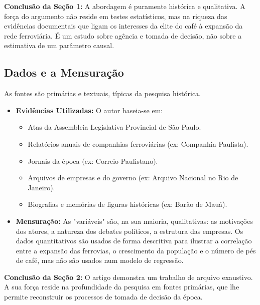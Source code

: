 \documentclass[12pt, a4paper]{article}
\begin{document}
\noindent\textbf{Conclusão da Seção 1:} A abordagem é puramente histórica e qualitativa. A força do argumento não reside em testes estatísticos, mas na riqueza das evidências documentais que ligam os interesses da elite do café à expansão da rede ferroviária. É um estudo sobre agência e tomada de decisão, não sobre a estimativa de um parâmetro causal.

\subsection{Dados e a Mensuração}
As fontes são primárias e textuais, típicas da pesquisa histórica.
\begin{itemize}
    \item \textbf{Evidências Utilizadas:} O autor baseia-se em:
        \begin{itemize}
            \item Atas da Assembleia Legislativa Provincial de São Paulo.
            \item Relatórios anuais de companhias ferroviárias (ex: Companhia Paulista).
            \item Jornais da época (ex: Correio Paulistano).
            \item Arquivos de empresas e do governo (ex: Arquivo Nacional no Rio de Janeiro).
            \item Biografias e memórias de figuras históricas (ex: Barão de Mauá).
        \end{itemize}
    \item \textbf{Mensuração:} As "variáveis" são, na sua maioria, qualitativas: as motivações dos atores, a natureza dos debates políticos, a estrutura das empresas. Os dados quantitativos são usados de forma descritiva para ilustrar a correlação entre a expansão das ferrovias, o crescimento da população e o número de pés de café, mas não são usados num modelo de regressão.
\end{itemize}

\noindent\textbf{Conclusão da Seção 2:} O artigo demonstra um trabalho de arquivo exaustivo. A sua força reside na profundidade da pesquisa em fontes primárias, que lhe permite reconstruir os processos de tomada de decisão da época.
\end{document}
